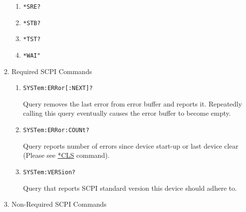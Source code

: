 \documentclass[a4paper,10pt]{article}
\begin{document}
\begin{enumerate}
\begin{enumerate}
        \item \begin{verbatim}*SRE?\end{verbatim}
        \item \begin{verbatim}*STB?\end{verbatim}
        \item \begin{verbatim}*TST?\end{verbatim}
        \item \begin{verbatim}*WAI"\end{verbatim}
    \end{enumerate}
\item Required SCPI Commands
    \begin{enumerate}
        \item 
            \begin{verbatim}SYSTem:ERRor[:NEXT]?\end{verbatim}
            \begin{description}
                Query removes the last error from error buffer and reports it. Repeatedly calling this query eventually causes the error buffer to become empty.
            \end{description}
        \item 
            \begin{verbatim}SYSTem:ERRor:COUNt?\end{verbatim}
            \begin{description}
                Query reports number of errors since device start-up or last device clear (Please see \hyperlink{cls}{*CLS} command).
            \end{description}
        \item 
            \begin{verbatim}SYSTem:VERSion?\end{verbatim}
            \begin{description}
                Query that reports SCPI standard version this device should adhere to.
            \end{description}
    \end{enumerate}
\item Non-Required SCPI Commands

\end{enumerate}
\end{document}
